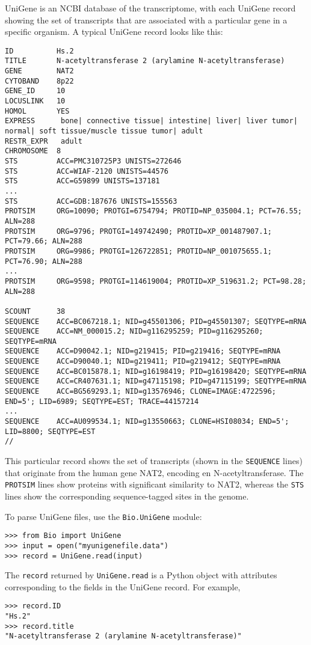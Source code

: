 UniGene is an NCBI database of the transcriptome, with each UniGene record showing the set of transcripts that are associated with a particular gene in a specific organism. A typical UniGene record looks like this:

\begin{verbatim}
ID          Hs.2
TITLE       N-acetyltransferase 2 (arylamine N-acetyltransferase)
GENE        NAT2
CYTOBAND    8p22
GENE_ID     10
LOCUSLINK   10
HOMOL       YES
EXPRESS      bone| connective tissue| intestine| liver| liver tumor| normal| soft tissue/muscle tissue tumor| adult
RESTR_EXPR   adult
CHROMOSOME  8
STS         ACC=PMC310725P3 UNISTS=272646
STS         ACC=WIAF-2120 UNISTS=44576
STS         ACC=G59899 UNISTS=137181
...
STS         ACC=GDB:187676 UNISTS=155563
PROTSIM     ORG=10090; PROTGI=6754794; PROTID=NP_035004.1; PCT=76.55; ALN=288
PROTSIM     ORG=9796; PROTGI=149742490; PROTID=XP_001487907.1; PCT=79.66; ALN=288
PROTSIM     ORG=9986; PROTGI=126722851; PROTID=NP_001075655.1; PCT=76.90; ALN=288
...
PROTSIM     ORG=9598; PROTGI=114619004; PROTID=XP_519631.2; PCT=98.28; ALN=288

SCOUNT      38
SEQUENCE    ACC=BC067218.1; NID=g45501306; PID=g45501307; SEQTYPE=mRNA
SEQUENCE    ACC=NM_000015.2; NID=g116295259; PID=g116295260; SEQTYPE=mRNA
SEQUENCE    ACC=D90042.1; NID=g219415; PID=g219416; SEQTYPE=mRNA
SEQUENCE    ACC=D90040.1; NID=g219411; PID=g219412; SEQTYPE=mRNA
SEQUENCE    ACC=BC015878.1; NID=g16198419; PID=g16198420; SEQTYPE=mRNA
SEQUENCE    ACC=CR407631.1; NID=g47115198; PID=g47115199; SEQTYPE=mRNA
SEQUENCE    ACC=BG569293.1; NID=g13576946; CLONE=IMAGE:4722596; END=5'; LID=6989; SEQTYPE=EST; TRACE=44157214
...
SEQUENCE    ACC=AU099534.1; NID=g13550663; CLONE=HSI08034; END=5'; LID=8800; SEQTYPE=EST
//
\end{verbatim}

This particular record shows the set of transcripts (shown in the \verb+SEQUENCE+ lines) that originate from the human gene NAT2, encoding en N-acetyltransferase. The \verb+PROTSIM+ lines show proteins with significant similarity to NAT2, whereas the \verb+STS+ lines show the corresponding sequence-tagged sites in the genome.

To parse UniGene files, use the \verb+Bio.UniGene+ module:
\begin{verbatim}
>>> from Bio import UniGene
>>> input = open("myunigenefile.data")
>>> record = UniGene.read(input)
\end{verbatim}

The \verb+record+ returned by \verb+UniGene.read+ is a Python object with attributes corresponding to the fields in the UniGene record. For example,
\begin{verbatim}
>>> record.ID
"Hs.2"
>>> record.title
"N-acetyltransferase 2 (arylamine N-acetyltransferase)"
\end{verbatim}

